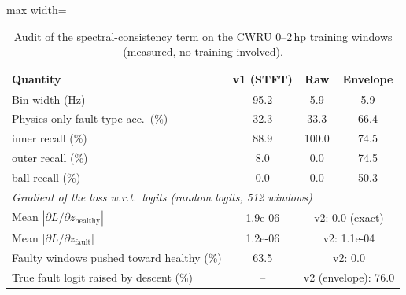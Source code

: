 \documentclass[conference]{IEEEtran}
\begin{document}
\begin{table}[t]
\caption{Audit of the spectral-consistency term on the CWRU 0--2\,hp training windows (measured, no training involved).}
\label{tab:audit}
\centering
\footnotesize
\begin{adjustbox}{max width=\columnwidth}
\begin{tabular}{lccc}
\toprule
Quantity & v1 (STFT) & Raw & Envelope \\
\midrule
Bin width (Hz) & 95.2 & 5.9 & 5.9 \\
Physics-only fault-type acc.\ (\%) & 32.3 & 33.3 & 66.4 \\
\quad inner recall (\%) & 88.9 & 100.0 & 74.5 \\
\quad outer recall (\%) & 8.0 & 0.0 & 74.5 \\
\quad ball recall (\%) & 0.0 & 0.0 & 50.3 \\
\midrule
\multicolumn{4}{l}{\emph{Gradient of the loss w.r.t.\ logits (random logits, 512 windows)}} \\
Mean $|\partial L/\partial z_{\mathrm{healthy}}|$ & 1.9e-06 & \multicolumn{2}{c}{v2: 0.0 (exact)} \\
Mean $|\partial L/\partial z_{\mathrm{fault}}|$ & 1.2e-06 & \multicolumn{2}{c}{v2: 1.1e-04} \\
Faulty windows pushed toward healthy (\%) & 63.5 & \multicolumn{2}{c}{v2: 0.0} \\
True fault logit raised by descent (\%) & -- & \multicolumn{2}{c}{v2 (envelope): 76.0} \\
\bottomrule
\end{tabular}
\end{adjustbox}
\end{table}
\end{document}
